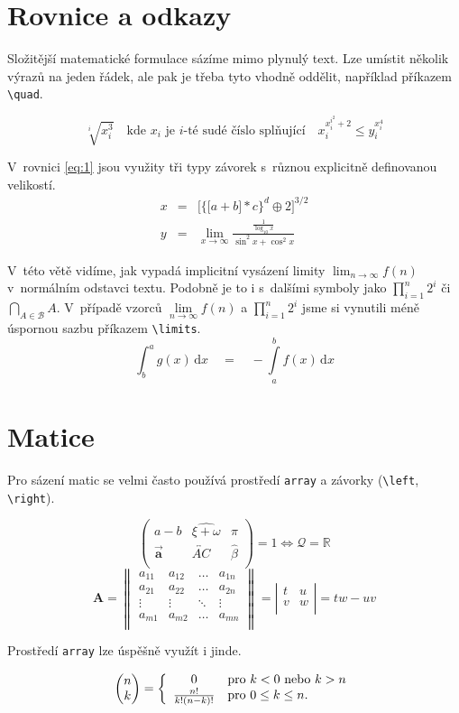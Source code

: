 \documentclass[draft, 11pt, a4paper,twocolumn]{article}
\begin{document}
\section{Rovnice a odkazy}
Složitější matematické formulace sázíme mimo plynulý text. Lze umístit několik výrazů na jeden řádek, ale pak je třeba tyto vhodně oddělit, například příkazem \verb|\quad|.

$$\sqrt[i]{x_i^3}\quad\text{kde }x_i\text{ je }i\text{-té sudé číslo splňující}\quad x_i^{x_i^{i^2}+2} \leq y_i^{x_i^4}$$

V~rovnici \eqref{eq:1} jsou využity tři typy závorek s~různou explicitně definovanou velikostí.
\begin{eqnarray}
    x & = & \bigg[ \Big\{ \big[a+b\big]*c\Big\}^d\oplus 2\bigg]^{3/2}\label{eq:1}\\
    y & = & \lim_{x\to\infty} \frac{\frac{1}{\log_{10}x}}{\sin^2{x}+\cos^2{x}} \nonumber
\end{eqnarray}

V~této větě vidíme, jak vypadá implicitní vysázení limity $\lim_{n\to\infty}f(n)$ v~normálním odstavci textu. Podobně je to i s~dalšími symboly jako $\prod _{i=1}^n 2^i$ či $\bigcap _{A \in \mathcal{B}}A$. V~případě vzorců $\lim\limits _{n\to\infty}f(n)$ a $\prod\limits _{i=1}^n 2^i$ jsme si vynutili méně úspornou sazbu příkazem \verb|\limits|.
\begin{equation}
    \int_b^a g(x)\,\mathrm{d}x \quad=\quad -\int\limits _a^b f(x)\,\mathrm{d}x
\end{equation}


\section{Matice}
Pro sázení matic se velmi často používá prostředí \verb|array| a závorky (\verb|\left|, \verb|\right|).

$$ \left( \begin{array}{ccc}
    a-b & \widehat{\xi + \omega}  & \pi \\
    \vec{\mathbf{a}} & \overleftrightarrow{AC} & \hat{\beta} \\
\end{array} \right)
=1 \Longleftrightarrow \mathcal{Q} = \mathbb{R}$$ 
$$
    \mathbf{A} = 
    \left\|
    \begin{array}{cccc}
    a_{11} & a_{12} & \ldots & a_{1n} \\
    a_{21} & a_{22} & \ldots & a_{2n} \\
    \vdots & \vdots & \ddots & \vdots \\
    a_{m1} & a_{m2} & \ldots & a_{mn} \\
    \end{array} \right\|
    =
    \left|
    \begin{array}{cc}
    t & u \\
    v & w \\
    \end{array} \right|
    = tw-uv
$$

Prostředí \verb|array| lze úspěšně využít i jinde.

$$
\begin{pmatrix}
    n \\
    k\\
\end{pmatrix}
=
\left\{ \begin{array}{c l}
0 & \text{pro } k < 0 \text{ nebo } k > n \\
\frac{n!}{k!(n-k)!} & \text{pro } 0 \leq k \leq n.
\end{array} \right.
$$
\end{document}
